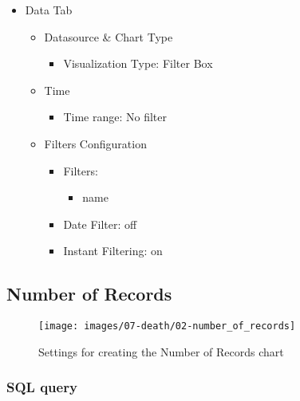 \documentclass[
]{book}
\providecommand{\tightlist}{%
  \setlength{\itemsep}{0pt}\setlength{\parskip}{0pt}}
\begin{document}
\begin{itemize}
\tightlist
\item
  Data Tab

  \begin{itemize}
  \tightlist
  \item
    Datasource \& Chart Type

    \begin{itemize}
    \tightlist
    \item
      Visualization Type: Filter Box
    \end{itemize}
  \item
    Time

    \begin{itemize}
    \tightlist
    \item
      Time range: No filter
    \end{itemize}
  \item
    Filters Configuration

    \begin{itemize}
    \tightlist
    \item
      Filters:

      \begin{itemize}
      \tightlist
      \item
        name
      \end{itemize}
    \item
      Date Filter: off
    \item
      Instant Filtering: on
    \end{itemize}
  \end{itemize}
\end{itemize}

\hypertarget{number-of-records}{%
\subsection*{Number of Records}\label{number-of-records}}

\begin{figure}
\texttt{[image: images/07-death/02-number\_of\_records]} \caption{Settings for creating the Number of Records chart}\label{fig:numberOfRecords}
\end{figure}

\hypertarget{sql-query-19}{%
\subsubsection*{SQL query}\label{sql-query-19}}
\end{document}
